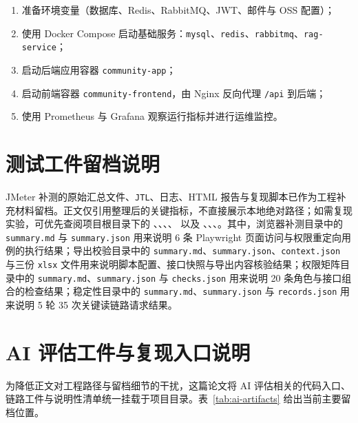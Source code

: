 \begin{enumerate}
  \item 准备环境变量（数据库、Redis、RabbitMQ、JWT、邮件与 OSS 配置）；
  \item 使用 Docker Compose 启动基础服务：\texttt{mysql}、\texttt{redis}、\texttt{rabbitmq}、\texttt{rag-service}；
  \item 启动后端应用容器 \texttt{community-app}；
  \item 启动前端容器 \texttt{community-frontend}，由 Nginx 反向代理 \texttt{/api} 到后端；
  \item 使用 Prometheus 与 Grafana 观察运行指标并进行运维监控。
\end{enumerate}

\chapter{测试工件留档说明}

JMeter 补测的原始汇总文件、\texttt{JTL}、日志、HTML 报告与复现脚本已作为工程补充材料留档。正文仅引用整理后的关键指标，不直接展示本地绝对路径；如需复现实验，可优先查阅项目根目录下的 、、、、 以及 、、、。其中，浏览器补测目录中的 \texttt{summary.md} 与 \texttt{summary.json} 用来说明 6 条 Playwright 页面访问与权限重定向用例的执行结果；导出校验目录中的 \texttt{summary.md}、\texttt{summary.json}、\texttt{context.json} 与三份 \texttt{xlsx} 文件用来说明脚本配置、接口快照与导出内容核验结果；权限矩阵目录中的 \texttt{summary.md}、\texttt{summary.json} 与 \texttt{checks.json} 用来说明 20 条角色与接口组合的检查结果；稳定性目录中的 \texttt{summary.md}、\texttt{summary.json} 与 \texttt{records.json} 用来说明 5 轮 35 次关键读链路请求结果。



\chapter{AI 评估工件与复现入口说明}

为降低正文对工程路径与留档细节的干扰，这篇论文将 AI 评估相关的代码入口、链路工件与说明性清单统一挂载于项目目录。表~\ref{tab:ai-artifacts} 给出当前主要留档位置。

